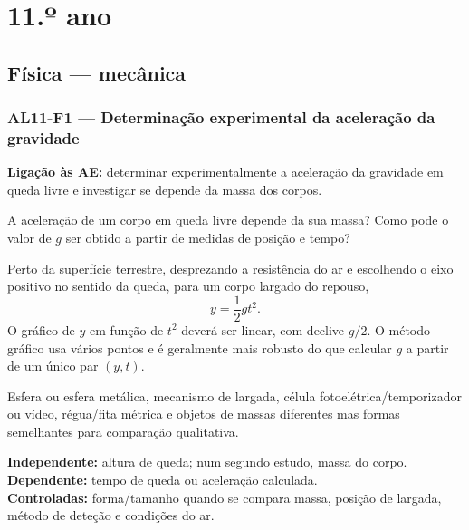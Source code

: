 \documentclass[11pt,a4paper,openany]{book}
\newcommand{\LigAE}[1]{\textbf{Ligação às AE:} #1}
\begin{document}
\part{11.º ano}

\chapter{Física — mecânica}

\section{AL11-F1 — Determinação experimental da aceleração da gravidade}
\LigAE{determinar experimentalmente a aceleração da gravidade em queda livre e investigar se depende da massa dos corpos.}

\begin{questao}
A aceleração de um corpo em queda livre depende da sua massa? Como pode o valor de $g$ ser obtido a partir de medidas de posição e tempo?
\end{questao}

\begin{fundamento}
Perto da superfície terrestre, desprezando a resistência do ar e escolhendo o eixo positivo no sentido da queda, para um corpo largado do repouso,
\[
y=\frac12gt^2.
\]
O gráfico de $y$ em função de $t^2$ deverá ser linear, com declive $g/2$. O método gráfico usa vários pontos e é geralmente mais robusto do que calcular $g$ a partir de um único par $(y,t)$.
\end{fundamento}

\begin{material}
Esfera ou esfera metálica, mecanismo de largada, célula fotoelétrica/temporizador ou vídeo, régua/fita métrica e objetos de massas diferentes mas formas semelhantes para comparação qualitativa.
\end{material}

\begin{variaveis}
\textbf{Independente:} altura de queda; num segundo estudo, massa do corpo.\\
\textbf{Dependente:} tempo de queda ou aceleração calculada.\\
\textbf{Controladas:} forma/tamanho quando se compara massa, posição de largada, método de deteção e condições do ar.
\end{variaveis}
\end{document}
